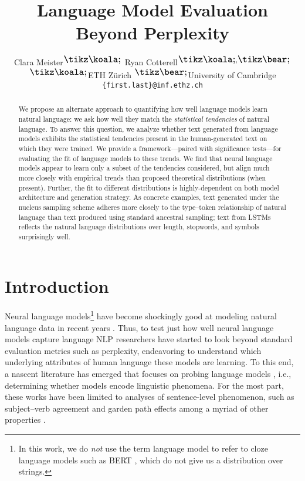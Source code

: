 \documentclass[11pt,a4paper]{article}
\title{Language Model Evaluation Beyond Perplexity }
\author{Clara Meister$^{\ethz}$ \hspace{3mm} Ryan Cotterell$^{\ethz,\ucambridge}$ \\
   $^{\ethz}$ETH Zürich \hspace{2mm} $^{\ucambridge}$University of Cambridge\\
   \texttt{\{first.last\}@inf.ethz.ch}
  }
\date{}
\newcommand{\note}[4][]{\todo[author=#2,color=#3,size=\scriptsize,fancyline,caption={},#1]{#4}} %
\newcommand{\ryan}[2][]{\note[#1]{ryan}{violet!40}{#2}}
\begin{document}
\maketitle
\begin{abstract}
We propose an alternate approach to quantifying how well language models learn natural language: we ask how well they match the \emph{statistical tendencies} of natural language. 
To answer this question, we analyze whether text generated from language models exhibits the statistical tendencies present in the human-generated text on which they were trained.
We provide a framework---paired with significance tests---for evaluating the fit of language models to these trends.
We find that neural language models appear to learn only a subset of the tendencies considered, but align much more closely with empirical trends than proposed theoretical distributions (when present).\ryan{What is the empirical--theoretical split?} Further, the fit to different distributions is highly-dependent on both model architecture and generation strategy. As concrete examples, text generated under the nucleus sampling scheme adheres more closely to the type--token relationship of natural language than text produced using standard ancestral sampling; text from LSTMs reflects the natural language distributions over length, stopwords, and symbols surprisingly well.  
\end{abstract}


\section{Introduction}



Neural language models\footnote{In this work, we do \emph{not} use the term language model to refer to cloze language models such as BERT \cite{devlin-etal-2019-bert}, which do not give us a distribution over strings.} have become shockingly good at modeling
natural language data in recent years \cite{merity2017regularizing, xlm, radford2019language}. 
Thus, to test just how well neural language models capture language NLP researchers have started to look beyond standard evaluation metrics such as perplexity, endeavoring to understand which underlying attributes of human language these models are learning.
To this end, a nascent literature has emerged that focuses on probing language models \cite{belinkov-glass-2019-analysis}, i.e., determining whether models encode linguistic phenomena. 
For the most part, these works have been limited to analyses of sentence-level phenomenon, such as subject--verb agreement \cite{gulordava-etal-2018-colorless} and garden path effects \cite{van-schijndel-linzen-2018-neural} among a myriad of other properties \cite[][\textit{inter alia}]{blevins-etal-2018-deep,chowdhury-zamparelli-2018-rnn}.
\end{document}
